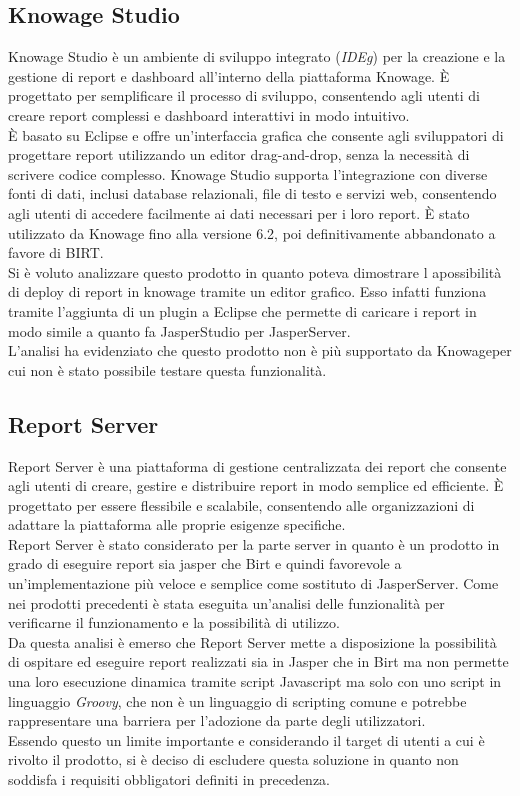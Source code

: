     \subsection{Knowage Studio}
    \label{sec:knowage-studio}
    Knowage Studio è un ambiente di sviluppo integrato (\emph{\gls{IDEg}\glsfirstoccur}) per la creazione e la gestione di report e dashboard all'interno della piattaforma Knowage. È progettato per semplificare il processo di sviluppo, consentendo agli utenti di creare report complessi e dashboard interattivi in modo intuitivo.\\
    È basato su Eclipse e offre un'interfaccia grafica che consente agli sviluppatori di progettare report utilizzando un editor drag-and-drop, senza la necessità di scrivere codice complesso. Knowage Studio supporta l'integrazione con diverse fonti di dati, inclusi database relazionali, file di testo e servizi web, consentendo agli utenti di accedere facilmente ai dati necessari per i loro report.
    È stato utilizzato da Knowage fino alla versione 6.2, poi definitivamente abbandonato a favore di BIRT.\\
    Si è voluto analizzare questo prodotto in quanto poteva dimostrare l apossibilità di deploy di report in knowage tramite un editor grafico. Esso infatti funziona tramite l'aggiunta di un plugin a Eclipse che permette di caricare i report in modo simile a quanto fa JasperStudio per JasperServer.\\
    L'analisi ha evidenziato che questo prodotto non è più supportato da Knowageper cui non è stato possibile testare questa funzionalità.

    \subsection{Report Server}
    \label{sec:report-server}
    Report Server è una piattaforma di gestione centralizzata dei report che consente agli utenti di creare, gestire e distribuire report in modo semplice ed efficiente. È progettato per essere flessibile e scalabile, consentendo alle organizzazioni di adattare la piattaforma alle proprie esigenze specifiche.\\
    Report Server è stato considerato per la parte server in quanto è un prodotto in grado di eseguire report sia jasper che Birt e quindi favorevole a un'implementazione più veloce e semplice come sostituto di JasperServer. Come nei prodotti precedenti è stata eseguita un'analisi delle funzionalità per verificarne il funzionamento e la possibilità di utilizzo.\\
    Da questa analisi è emerso che Report Server mette a disposizione la possibilità di ospitare ed eseguire report realizzati sia in Jasper che in Birt ma non permette una loro esecuzione dinamica tramite script Javascript ma solo con uno script in linguaggio \emph{Groovy}, che non è un linguaggio di scripting comune e potrebbe rappresentare una barriera per l'adozione da parte degli utilizzatori.\\
    Essendo questo un limite importante e considerando il target di utenti a cui è rivolto il prodotto, si è deciso di escludere questa soluzione in quanto non soddisfa i requisiti obbligatori definiti in precedenza.\\

